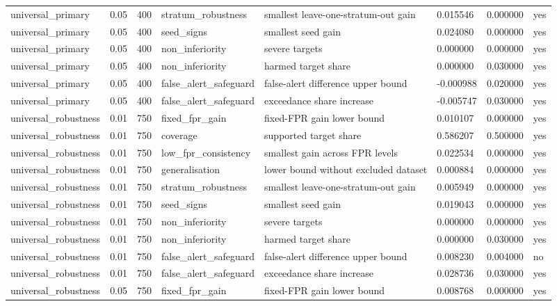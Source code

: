 \begin{tabular}{llllllll}
universal\_primary & 0.05 & 400 & stratum\_robustness & smallest leave-one-stratum-out gain & 0.015546 & 0.000000 & yes \\
universal\_primary & 0.05 & 400 & seed\_signs & smallest seed gain & 0.024080 & 0.000000 & yes \\
universal\_primary & 0.05 & 400 & non\_inferiority & severe targets & 0.000000 & 0.000000 & yes \\
universal\_primary & 0.05 & 400 & non\_inferiority & harmed target share & 0.000000 & 0.030000 & yes \\
universal\_primary & 0.05 & 400 & false\_alert\_safeguard & false-alert difference upper bound & -0.000988 & 0.020000 & yes \\
universal\_primary & 0.05 & 400 & false\_alert\_safeguard & exceedance share increase & -0.005747 & 0.030000 & yes \\
universal\_robustness & 0.01 & 750 & fixed\_fpr\_gain & fixed-FPR gain lower bound & 0.010107 & 0.000000 & yes \\
universal\_robustness & 0.01 & 750 & coverage & supported target share & 0.586207 & 0.500000 & yes \\
universal\_robustness & 0.01 & 750 & low\_fpr\_consistency & smallest gain across FPR levels & 0.022534 & 0.000000 & yes \\
universal\_robustness & 0.01 & 750 & generalisation & lower bound without excluded dataset & 0.000884 & 0.000000 & yes \\
universal\_robustness & 0.01 & 750 & stratum\_robustness & smallest leave-one-stratum-out gain & 0.005949 & 0.000000 & yes \\
universal\_robustness & 0.01 & 750 & seed\_signs & smallest seed gain & 0.019043 & 0.000000 & yes \\
universal\_robustness & 0.01 & 750 & non\_inferiority & severe targets & 0.000000 & 0.000000 & yes \\
universal\_robustness & 0.01 & 750 & non\_inferiority & harmed target share & 0.000000 & 0.030000 & yes \\
universal\_robustness & 0.01 & 750 & false\_alert\_safeguard & false-alert difference upper bound & 0.008230 & 0.004000 & no \\
universal\_robustness & 0.01 & 750 & false\_alert\_safeguard & exceedance share increase & 0.028736 & 0.030000 & yes \\
universal\_robustness & 0.05 & 750 & fixed\_fpr\_gain & fixed-FPR gain lower bound & 0.008768 & 0.000000 & yes \\

\end{tabular}
